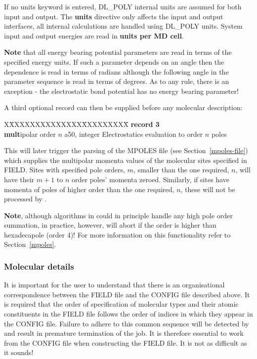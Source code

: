\noindent If no units keyword is entered, DL\_POLY internal units
are assumed for both input and output.  The {\bf units} directive
only affects the input and output interfaces, all internal
calculations are handled using DL\_POLY units.  System input and
output energies are read in {\bf units per MD cell}.

{\bf Note} that all energy bearing potential parameters are read
in terms of the specified energy units.  If such a parameter
depends on an angle then the dependence is read in terms of
radians although the following angle in the parameter sequence
is read in terms of degrees.  As to any rule, there is an exception
- the electrostatic bond potential has no energy bearing parameter!

A third optional record can then be supplied before any molecular
description:
\begin{tabbing}
X\=XXXXXXXXXXXXXX\=XXXXXXXXX\=\kill
{\bf record 3} \\
\> {\bf mult}ipolar order $n$ \> a50, integer \> Electrostatics evaluation to order $n$ poles
\end{tabbing}
\noindent This will later trigger the parsing of the MPOLES file
(see Section~\ref{mpoles-file}) which supplies the multipolar
momenta values of the molecular sites specified in FIELD.  Sites
with specified pole orders, $m$, smaller than the one required, $n$,
will have their $m+1$ to $n$ order poles' momenta zeroed.
Similarly, if sites have momenta of poles of higher order than
the one required, $n$, these will not be processed by \D.

{\bf Note}, although algorithms in \D could in principle handle
any high pole order summation, in practice, however, \D will abort
if the order is higher than hexadecapole (order 4)!  For more
information on this functionality refer to Section~\ref{mpoles}.

\subsubsection*{Molecular details}

It is important for the user to understand that there is an
organisational correspondence between the FIELD file and the
CONFIG file described above.  It is required that the order of
specification of molecular types and their atomic constituents in
the FIELD file follows the order of indices in which they appear
in the CONFIG file.  Failure to adhere to this common sequence
will be detected by \D and result in premature termination of the
job. It is therefore essential to work from the CONFIG file when
constructing the FIELD file.  It is not as difficult as it sounds!

